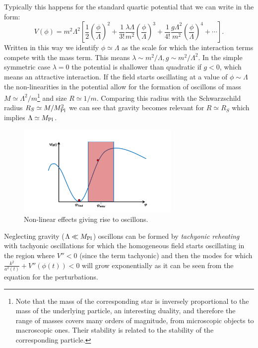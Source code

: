 Typically this happens for the standard quartic potential that we can write in the form:
\begin{equation}
V(\phi)= m^2\Lambda^2\left[\frac12\left(\frac{\phi}{\Lambda}\right)^2+\frac{1}{3!}\frac{\lambda\Lambda}{m^2} \left(\frac{\phi}{\Lambda}\right)^3+\frac{1}{4!}\frac{g\Lambda^2}{m^2}\left(\frac{\phi}{\Lambda}\right)^4 +\cdots\right].
\end{equation}
Written in this way we identify $\phi \simeq \Lambda$ as the scale for which the interaction terms compete with the mass term. This means $\lambda\sim m^2/\Lambda, g\sim m^2/\Lambda^2$. In the simple symmetric case $\lambda=0$  the potential is shallower than quadratic if $g<0$, which means an attractive interaction. If the field starts oscillating at a value of $\phi\sim \Lambda$  the non-linearities in the potential allow for the formation of oscillons of mass $M\simeq \Lambda^2/m$\footnote{Note that the mass of the corresponding star is inversely proportional to the mass of the underlying particle, an interesting duality, and therefore the range of masses covers many orders of magnitude, from microscopic objects to macroscopic ones. Their stability is related to the stability of the corresponding particle.} and size $R\simeq 1/m$. Comparing this radius with the Schwarzschild radius $R_S\simeq M/M_{\rm Pl}^2$ we can see that gravity becomes relevant for $R\simeq R_S$ which implies $\Lambda\simeq M_{\rm Pl}$.

\begin{figure}[ht]
    \centering
    \includegraphics[width = 0.7\textwidth]{Sections/Figures/Oscillon1.pdf} 
    \caption{Non-linear effects giving rise to oscillons.}
    \label{fig:Oscillons}
\end{figure}


Neglecting gravity ($\Lambda \ll M_{\rm Pl}$) oscillons can be formed  by {\it tachyonic reheating} with tachyonic oscillations for which the homogeneous field starts oscillating in the region where $V''<0$ (since the term tachyonic) and then the modes for which $\frac{k^2}{a^2(t)}+V''(\phi(t))<0$ will grow exponentially as it can be seen from the equation for the perturbations.

